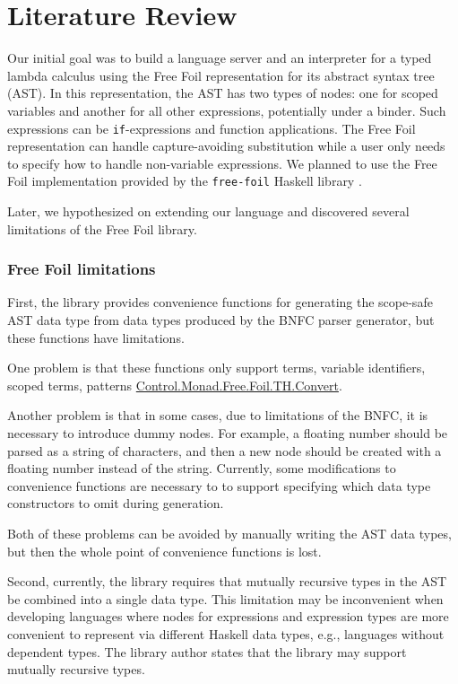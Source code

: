 \chapter{Literature Review}
\label{chap:LiteratureReview}

Our initial goal was to build a language server and an interpreter for a typed lambda calculus using the Free Foil \cite{kudasov-free-2024} representation for its abstract syntax tree (AST).
In this representation, the AST has two types of nodes: one for scoped variables and another for all other expressions, potentially under a binder.
Such expressions can be \texttt{if}-expressions and function applications.
The Free Foil representation can handle capture-avoiding substitution while a user only needs to specify how to handle non-variable expressions.
We planned to use the Free Foil implementation provided by the \texttt{free-foil} Haskell library \cite{kudasov-free-foil}.

Later, we hypothesized on extending our language and discovered several limitations of the Free Foil library.

\subsection{Free Foil limitations}
\label{chap:LiteratureReview:sec:FreeFoilLimitations}

First, the library provides convenience functions for generating the scope-safe AST data type from data types produced by the BNFC parser generator, but these functions have limitations.

One problem is that these functions only support terms, variable identifiers, scoped terms, patterns \href{https://hackage.haskell.org/package/free-foil-0.2.0/docs/Control-Monad-Free-Foil-TH-Convert.html}{Control.Monad.Free.Foil.TH.Convert}.

Another problem is that in some cases, due to limitations of the BNFC, it is necessary to introduce dummy nodes. For example, a floating number should be parsed as a string of characters, and then a new node should be created with a floating number instead of the string. Currently, some modifications to convenience functions are necessary to to support specifying which data type constructors to omit during generation.

Both of these problems can be avoided by manually writing the AST data types, but then the whole point of convenience functions is lost.

Second, currently, the library requires that mutually recursive types in the AST be combined into a single data type.
This limitation may be inconvenient when developing languages where nodes for expressions and expression types are more convenient to represent via different Haskell data types, e.g., languages without dependent types. The library author states that the library may support mutually recursive types.

